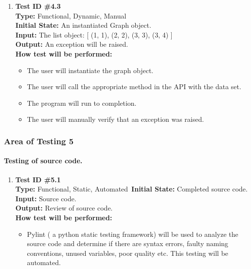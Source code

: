 \documentclass[12pt, titlepage]{article}
\begin{document}
\begin{enumerate}
			\item{\textbf{Test ID \#4.3\\}}
			\textbf{Type:} Functional, Dynamic, Manual\\
			\textbf{Initial State:}  An instantiated Graph object.\\
			\textbf{Input:} The list object: [ (1, 1),  (2, 2), (3, 3), (3, 4) ]\\
			\textbf{Output:} An exception will be raised. \\
			\textbf{How test will be performed:}
				\begin{itemize}[label={--}]
					\item The user will instantiate the graph object.
					\item The user will call the appropriate method in the API with the data set.
					\item The program will run to completion.
					\item The user will manually verify that an exception was raised.
				\end{itemize}
	\end{enumerate}
	
\subsubsection{Area of Testing 5}		
	\paragraph{Testing of source code.}
		\begin{enumerate}
			\item{\textbf{Test ID \#5.1\\}}
			\textbf{Type:} Functional, Static, Automated\
			\textbf{Initial State:} Completed source code. \\
			\textbf{Input:} Source code.\\
			\textbf{Output:} Review of source code.\\
			\textbf{How test will be performed:}
				\begin{itemize}[label={--}]
					\item Pylint ( a python static testing framework) will be used to analyze the source code and determine if there are syntax errors, faulty naming conventions, unused variables, poor quality etc. This testing will be automated.							
				\end{itemize}
		\end{enumerate}
		
\end{document}

